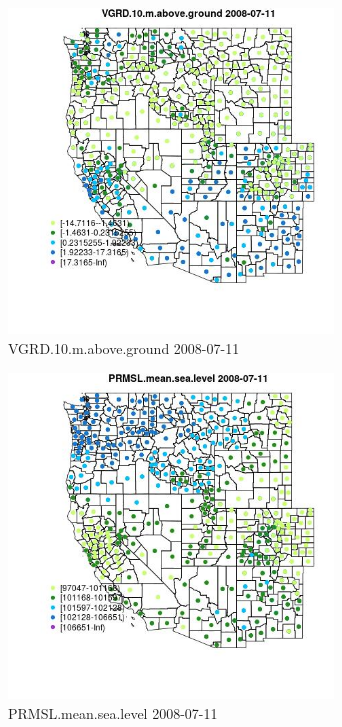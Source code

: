 \begin{figure} 
\centering  
\includegraphics[width=0.77\textwidth]{Code_Outputs/df_report_ML_predictors_CountyCentroid_Locations_Dates_2008-01-01to2018-12-31_MapObsVGRD10maboveground2008-07-11.jpg} 
\caption{\label{fig:df_report_ML_predictors_CountyCentroid_Locations_Dates_2008-01-01to2018-12-31MapObsVGRD10maboveground2008-07-11}VGRD.10.m.above.ground 2008-07-11} 
\end{figure} 
 

\begin{figure} 
\centering  
\includegraphics[width=0.77\textwidth]{Code_Outputs/df_report_ML_predictors_CountyCentroid_Locations_Dates_2008-01-01to2018-12-31_MapObsPRMSLmeansealevel2008-07-11.jpg} 
\caption{\label{fig:df_report_ML_predictors_CountyCentroid_Locations_Dates_2008-01-01to2018-12-31MapObsPRMSLmeansealevel2008-07-11}PRMSL.mean.sea.level 2008-07-11} 
\end{figure} 
 

